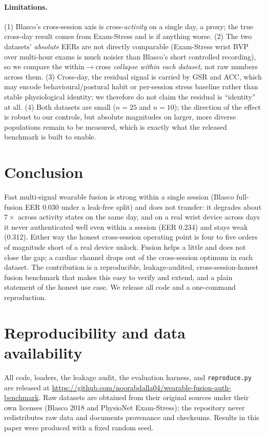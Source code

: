 \documentclass[11pt]{article}
\begin{document}
\paragraph{Limitations.} (1) Blasco's cross-session axis is cross-\emph{activity} on a single
day, a proxy; the true cross-day result comes from Exam-Stress and is if anything worse.
(2) The two datasets' \emph{absolute} EERs are not directly comparable (Exam-Stress wrist
BVP over multi-hour exams is much noisier than Blasco's short controlled recording), so we
compare the within$\to$cross \emph{collapse within each dataset}, not raw numbers across them.
(3) Cross-day, the residual signal is carried by GSR and ACC, which may encode
behavioural/postural habit or per-session stress baseline rather than stable physiological
identity; we therefore do not claim the residual is ``identity'' at all. (4) Both datasets are
small ($n=25$ and $n=10$); the direction of the effect is robust to our controls, but absolute
magnitudes on larger, more diverse populations remain to be measured, which is exactly what
the released benchmark is built to enable.

\section{Conclusion}
Fast multi-signal wearable fusion is strong within a single session (Blasco full-fusion EER
\num{0.030} under a leak-free split) and does not transfer: it degrades about $7\times$ across
activity states on the same day, and on a real wrist device across days it never authenticated
well even within a session (EER \num{0.234}) and stays weak (\num{0.312}). Either way the
honest cross-session operating point is four to five orders of magnitude short of a real device
unlock. Fusion helps a little and does not close the gap; a cardiac channel drops out of the
cross-session optimum in each dataset. The contribution is a reproducible, leakage-audited,
cross-session-honest fusion benchmark that makes this easy to verify and extend, and a plain
statement of the honest use case. We release all code and a one-command reproduction.

\section*{Reproducibility and data availability}
All code, loaders, the leakage audit, the evaluation harness, and \texttt{reproduce.py} are
released at \url{https://github.com/noorabdalla04/wearable-fusion-auth-benchmark}. Raw datasets
are obtained from their original sources under their own licenses (Blasco 2018 and PhysioNet
Exam-Stress); the repository never redistributes raw data and documents provenance and
checksums. Results in this paper were produced with a fixed random seed.



\end{document}
